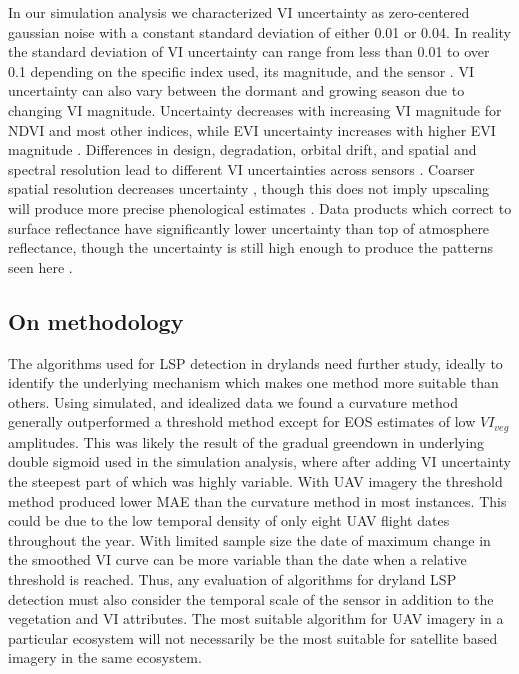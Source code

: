 \documentclass{article}
\begin{document}
In our simulation analysis we characterized VI uncertainty as zero-centered gaussian noise with a constant standard deviation of either 0.01 or 0.04. In reality the standard deviation of VI uncertainty can range from less than 0.01 to over 0.1 depending on the specific index used, its magnitude, and the sensor \cite{miura2000, nagol2009, borgogno-mondino2016}. VI uncertainty can also vary between the dormant and growing season due to changing VI magnitude. Uncertainty decreases with increasing VI magnitude for NDVI and most other indices, while EVI uncertainty increases with higher EVI magnitude \cite{miura2000}. Differences in design, degradation, orbital drift, and spatial and spectral resolution lead to different VI uncertainties across sensors \cite{miura2000, fan2017}. Coarser spatial resolution decreases uncertainty \cite{chen-zorn2013}, though this does not imply upscaling will produce more precise phenological estimates \cite{zhang-wang2017, peng-zhang2017, zeng-wardlow2020}. Data products which correct to surface reflectance have significantly lower uncertainty than top of atmosphere reflectance, though the uncertainty is still high enough to produce the patterns seen here \cite{nagol2009}. 

\subsection{On methodology}

The algorithms used for LSP detection in drylands need further study, ideally to identify the underlying mechanism which makes one method more suitable than others. Using simulated, and idealized data we found a curvature method generally outperformed a threshold method except for EOS estimates of low $VI_{veg}$ amplitudes. This was likely the result of the gradual greendown in underlying double sigmoid used in the simulation analysis, where after adding VI uncertainty the steepest part of which was highly variable. With UAV imagery the threshold method produced lower MAE than the curvature method in most instances. This could be due to the low temporal density of only eight UAV flight dates throughout the year. With limited sample size the date of maximum change in the smoothed VI curve can be more variable than the date when a relative threshold is reached. Thus, any evaluation of algorithms for dryland LSP detection must also consider the temporal scale of the sensor in addition to the vegetation and VI attributes. The most suitable algorithm for UAV imagery in a particular ecosystem will not necessarily be the most suitable for satellite based imagery in the same ecosystem.
\end{document}
